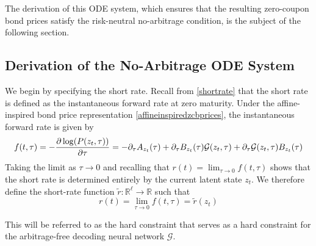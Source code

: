 The derivation of this ODE system, which ensures that the resulting zero-coupon bond prices satisfy the risk-neutral no-arbitrage condition, is the subject of the following section.


\subsection{Derivation of the No-Arbitrage ODE System}


We begin by specifying the short rate. Recall from \eqref{shortrate} that the short rate is defined as the instantaneous forward rate at zero maturity. Under the affine-inspired bond price representation \eqref{affineinspiredzcbprices}, the instantaneous forward rate is given by
\begin{equation}
    f(t,\tau)=-\frac{\partial\log(P(z_t,\tau))}{\partial \tau}\\
    =-\partial_{\tau}A_{z_t}(\tau)+\partial_{\tau}B_{z_t}(\tau)\mathcal{G}(z_t,\tau)+\partial_{\tau}\mathcal{G}(z_t,\tau)B_{z_t}(\tau)
    \label{eq:instantforwardrate}
\end{equation}
Taking the limit as $\tau \to 0$ and recalling that 
$r(t)=\lim_{\tau\to0}f(t,\tau)$
shows that the short rate is determined entirely by the current latent state $z_t$. We therefore define the short-rate function $\tilde r:\mathbb{R}^\ell\to\mathbb{R}$ such that
\begin{equation}
    r(t)=\lim_{\tau\to0}f(t,\tau)=\tilde r(z_t)
    \label{hardconstraint}
\end{equation}

This will be referred to as the hard constraint that serves as a hard constraint for the arbitrage-free decoding neural network $\mathcal{G}$.


